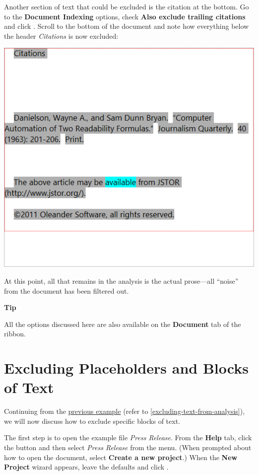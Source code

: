 \documentclass[
]{book}
\newenvironment{tipsection}
    {
    \begin{tcolorbox}[colframe=lightgray,colback=lightyellow,arc=3mm]
    \faLightbulb[regular] \textbf{Tip} \newline
    }
    {
    \end{tcolorbox}
    }
\theoremstyle{definition}
\theoremstyle{definition}
\theoremstyle{definition}
\theoremstyle{definition}
\theoremstyle{remark}
\begin{document}
Another section of text that could be excluded is the citation at the bottom. Go to the \textbf{Document Indexing} options, check \textbf{Also exclude trailing citations} and click . Scroll to the bottom of the document and note how everything below the header \emph{Citations} is now excluded:

\begin{center}\includegraphics[width=0.75\linewidth,]{Images/ExclusionExampleCitationExcluded} \end{center}

At this point, all that remains in the analysis is the actual prose---all ``noise'' from the document has been filtered out.

\begin{tipsection}
All the options discussed here are also available on the \textbf{Document} tab of the ribbon.

\end{tipsection}

\newpage

\hypertarget{excluding-placeholders}{%
\section{Excluding Placeholders and Blocks of Text}\label{excluding-placeholders}}

Continuing from the \protect\hyperlink{excluding-text-from-analysis}{previous example} (refer to \ref{excluding-text-from-analysis}), we will now discuss how to exclude specific blocks of text.

The first step is to open the example file \emph{Press Release}. From the \textbf{Help} tab, click the  button and then select \emph{Press Release} from the menu. (When prompted about how to open the document, select \textbf{Create a new project}.) When the \textbf{New Project} wizard appears, leave the defaults and click .
\end{document}
